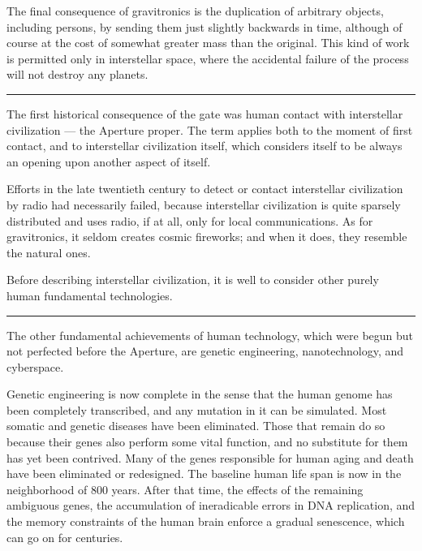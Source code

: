 \documentclass[english,11pt,letterpaper,onecolumn]{scrbook}
\begin{document}
	The final consequence of gravitronics is the duplication of arbitrary objects, including persons, by sending them just slightly backwards in time, although of course at the cost of somewhat greater mass than the original.  This kind of work is permitted only in interstellar space, where the accidental failure of the process will not destroy any planets.

\begin{center}\rule[3pt]{2in}{0.5pt}\end{center}

	The first historical consequence of the gate was human contact with interstellar civilization --- the Aperture proper.  The term applies both to the moment of first contact, and to interstellar civilization itself, which considers itself to be always an opening upon another aspect of itself.  

	Efforts in the late twentieth century to detect or contact interstellar civilization by radio had necessarily failed, because interstellar civilization is quite sparsely distributed and uses radio, if at all, only for local communications.  As for gravitronics, it seldom creates cosmic fireworks; and when it does, they resemble the natural ones.

	Before describing interstellar civilization, it is well to consider other purely human fundamental technologies.

\begin{center}\rule[3pt]{2in}{0.5pt}\end{center}

	The other fundamental achievements of human technology, which were begun but not perfected before the Aperture, are genetic engineering, nanotechnology, and cyberspace.

	Genetic engineering is now complete in the sense that the human genome has been completely transcribed, and any mutation in it can be simulated.  Most somatic and genetic diseases have been eliminated.  Those that remain do so because their genes also perform some vital function, and no substitute for them has yet been contrived.  Many of the genes responsible for human aging and death have been eliminated or redesigned.  The baseline human life span is now in the neighborhood of 800 years.  After that time, the effects of the remaining ambiguous genes, the accumulation of ineradicable errors in DNA replication, and the memory constraints of the human brain enforce a gradual senescence, which can go on for centuries.
\end{document}

